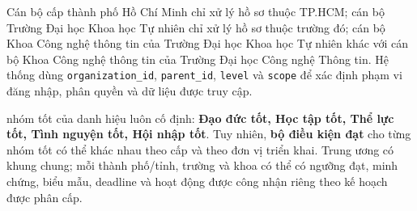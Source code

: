 \noindent Cán bộ cấp thành phố Hồ Chí Minh chỉ xử lý hồ sơ thuộc TP.HCM; cán bộ Trường Đại học Khoa học Tự nhiên chỉ xử lý hồ sơ thuộc trường đó; cán bộ Khoa Công nghệ thông tin của Trường Đại học Khoa học Tự nhiên khác với cán bộ Khoa Công nghệ thông tin của Trường Đại học Công nghệ Thông tin. Hệ thống dùng \texttt{organization\_id}, \texttt{parent\_id}, \texttt{level} và \texttt{scope} để xác định phạm vi đăng nhập, phân quyền và dữ liệu được truy cập.

 nhóm tốt của danh hiệu luôn cố định: \textbf{Đạo đức tốt, Học tập tốt, Thể lực tốt, Tình nguyện tốt, Hội nhập tốt}. Tuy nhiên, \textbf{bộ điều kiện đạt} cho từng nhóm tốt có thể khác nhau theo cấp và theo đơn vị triển khai. Trung ương có khung chung; mỗi thành phố/tỉnh, trường và khoa có thể có ngưỡng đạt, minh chứng, biểu mẫu, deadline và hoạt động được công nhận riêng theo kế hoạch được phân cấp.